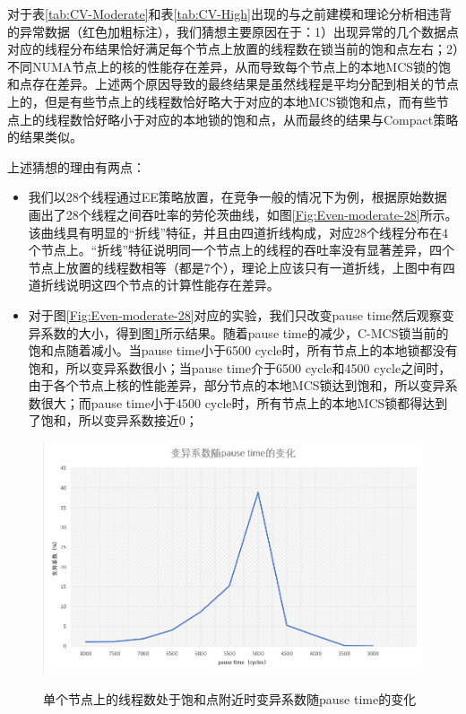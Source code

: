 对于表\ref{tab:CV-Moderate}和表\ref{tab:CV-High}出现的与之前建模和理论分析相违背的异常数据（红色加粗标注），我们猜想主要原因在于：1）出现异常的几个数据点对应的线程分布结果恰好满足每个节点上放置的线程数在锁当前的饱和点左右；2）不同NUMA节点上的核的性能存在差异，从而导致每个节点上的本地MCS锁的饱和点存在差异。上述两个原因导致的最终结果是虽然线程是平均分配到相关的节点上的，但是有些节点上的线程数恰好略大于对应的本地MCS锁饱和点，而有些节点上的线程数恰好略小于对应的本地锁的饱和点，从而最终的结果与Compact策略的结果类似。

上述猜想的理由有两点：
\begin{itemize}
    \item 我们以28个线程通过EE策略放置，在竞争一般的情况下为例，根据原始数据画出了28个线程之间吞吐率的劳伦茨曲线，如图\ref{Fig:Even-moderate-28}所示。该曲线具有明显的“折线”特征，并且由四道折线构成，对应28个线程分布在4个节点上。“折线”特征说明同一个节点上的线程的吞吐率没有显著差异，四个节点上放置的线程数相等（都是7个），理论上应该只有一道折线，上图中有四道折线说明这四个节点的计算性能存在差异。
    \item 对于图\ref{Fig:Even-moderate-28}对应的实验，我们只改变pause time然后观察变异系数的大小，得到图\ref{Fig:CV-pause}所示结果。随着pause time的减少，C-MCS锁当前的饱和点随着减小。当pause time小于6500 cycle时，所有节点上的本地锁都没有饱和，所以变异系数很小；当pause time介于6500 cycle和4500 cycle之间时，由于各个节点上核的性能差异，部分节点的本地MCS锁达到饱和，所以变异系数很大；而pause time小于4500 cycle时，所有节点上的本地MCS锁都得达到了饱和，所以变异系数接近0；
\end{itemize}

\begin{figure}[t]
	\centering
	\includegraphics[width=5.6in]{figure/CV-pause.PNG}
	\caption{单个节点上的线程数处于饱和点附近时变异系数随pause time的变化}{}
	\label{Fig:CV-pause}
\end{figure}

